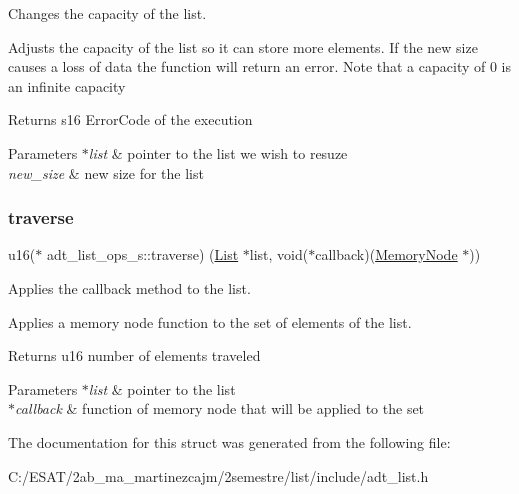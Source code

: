 Changes the capacity of the list. 

Adjusts the capacity of the list so it can store more elements. If the new size causes a loss of data the function will return an error. Note that a capacity of 0 is an infinite capacity

\begin{DoxyReturn}{Returns}
s16 Error\+Code of the execution 
\end{DoxyReturn}

\begin{DoxyParams}{Parameters}
{\em $\ast$list} & pointer to the list we wish to resuze \\
\hline
{\em new\+\_\+size} & new size for the list \\
\hline
\end{DoxyParams}
\mbox{\label{structadt__list__ops__s_a0b028b97d034c3d49b50f5a56dc271a5}} 
\subsubsection{\texorpdfstring{traverse}{traverse}}
{\footnotesize\ttfamily u16($\ast$ adt\+\_\+list\+\_\+ops\+\_\+s\+::traverse) (\hyperlink{structadt__list__s}{List} $\ast$list, void($\ast$callback)(\hyperlink{structmemory__node__s}{Memory\+Node} $\ast$))}



Applies the callback method to the list. 

Applies a memory node function to the set of elements of the list.

\begin{DoxyReturn}{Returns}
u16 number of elements traveled 
\end{DoxyReturn}

\begin{DoxyParams}{Parameters}
{\em $\ast$list} & pointer to the list \\
\hline
{\em $\ast$callback} & function of memory node that will be applied to the set \\
\hline
\end{DoxyParams}


The documentation for this struct was generated from the following file\+:\begin{DoxyCompactItemize}
\item 
C\+:/\+E\+S\+A\+T/2ab\+\_\+ma\+\_\+martinezcajm/2semestre/list/include/adt\+\_\+list.\+h\end{DoxyCompactItemize}
